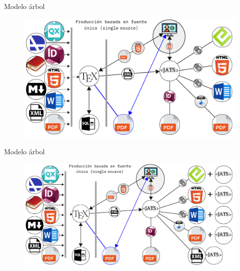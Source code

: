 \documentclass[14pt,aspectratio=169]{beamer}
\begin{document}
\begin{frame}{Modelo árbol}
	\begin{figure}
		\centering
		\includegraphics[width=.8\textwidth]{arbol2.pdf}
	\end{figure}
\end{frame}

\begin{frame}{Modelo árbol}
	\begin{figure}
		\centering
		\includegraphics[width=.9\textwidth]{arbol3.pdf}
	\end{figure}
\end{frame}
\end{document}
